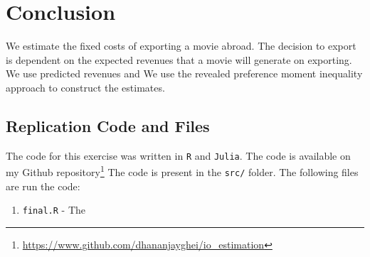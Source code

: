 \documentclass[11pt, letterpaper]{article} \usepackage{amsmath}
\begin{document}
\section{Conclusion}
We estimate the fixed costs of exporting a movie abroad. The decision
to export is dependent on the expected revenues that a movie will
generate on exporting. We use predicted revenues and  We use the
revealed preference moment inequality approach to construct the
estimates. 
\newpage

\newpage
\begin{appendix}
  \section{Replication Code and Files}
  The code for this exercise was written in \texttt{R} and
  \texttt{Julia}. The code is available on my Github
  repository\footnote{\url{https://www.github.com/dhananjayghei/io_estimation}}
The code is present in the \texttt{src/} folder. The following files
are run the code:
\begin{enumerate}
\item \texttt{final.R} - The 
\end{enumerate}
\end{appendix}
\end{document}
